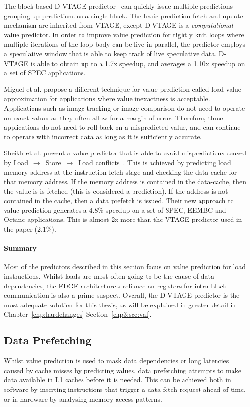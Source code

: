 The block based D-VTAGE predictor~\cite{peraisBeBop2015} can quickly issue multiple predictions grouping up predictions as a single block.
The basic prediction fetch and update mechanism are inherited from VTAGE, except D-VTAGE is a \textit{computational} value predictor.
In order to improve value prediction for tightly knit loops where multiple iterations of the loop body can be live in parallel, the predictor employs a speculative window that is able to keep track of live speculative data.
D-VTAGE is able to obtain up to a 1.7x speedup, and averages a 1.10x speedup on a set of SPEC applications. 

Miguel et al. propose a different technique for value prediction called load value approximation \cite{miguel2014LoadVal} for applications where value inexactness is acceptable.
Applications such as image tracking or image comparison do not need to operate on exact values as they often allow for a margin of error.
Therefore, these applications do not need to roll-back on a mispredicted value, and can continue to operate with incorrect data as long as it is sufficiently accurate.

Sheikh et al. present a value predictor that is able to avoid mispredictions caused by Load $\,\to\,$ Store $\,\to\,$ Load conflicts~\cite{sheikh2017value}.
This is achieved by predicting load memory address at the instruction fetch stage and checking the data-cache for that memory address.
If the memory address is contained in the data-cache, then the value is is fetched (this is considered a prediction).
If the address is not contained in the cache, then a data prefetch is issued.
Their new approach to value prediction generates a 4.8\% speedup on a set of SPEC, EEMBC and Octane applications.
This is almost 2x more than the VTAGE predictor used in the paper (2.1\%).

\paragraph*{Summary}
Most of the predictors described in this section focus on value prediction for load instructions.
Whilst loads are most often going to be the cause of data-dependencies, the EDGE architecture's reliance on registers for intra-block communication is also a prime suspect.
Overall, the D-VTAGE predictor is the most adequate solution for this thesis, as will be explained in greater detail in Chapter~\ref{chp:hardchanges} Section~\ref{chp3:sec:val}.

\subsection{Data Prefetching}
Whilst value prediction is used to mask data dependencies or long latencies caused by cache misses by predicting values, data prefetching attempts to make data available in L1 caches before it is needed.
This can be achieved both in software by inserting instructions that trigger a data fetch-request ahead of time, or in hardware by analysing memory access patterns.

